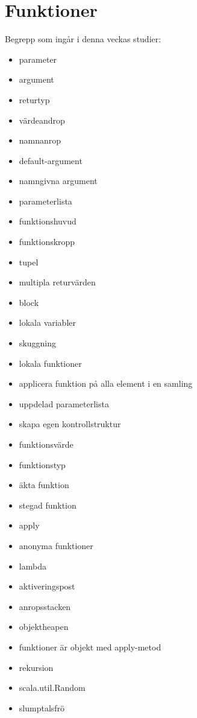 \chapter{Funktioner}\label{chapter:W03}
Begrepp som ingår i denna veckas studier:
\begin{multicols}{2}\begin{itemize}[noitemsep,label={$\square$},leftmargin=*]
\item parameter
\item argument
\item returtyp
\item värdeandrop
\item namnanrop
\item default-argument
\item namngivna argument
\item parameterlista
\item funktionshuvud
\item funktionskropp
\item tupel
\item multipla returvärden
\item block
\item lokala variabler
\item skuggning
\item lokala funktioner
\item applicera funktion på alla element i en samling
\item uppdelad parameterlista
\item skapa egen kontrollstruktur
\item funktionsvärde
\item funktionstyp
\item äkta funktion
\item stegad funktion
\item apply
\item anonyma funktioner
\item lambda
\item aktiveringspost
\item anropsstacken
\item objektheapen
\item funktioner är objekt med apply-metod
\item rekursion
\item scala.util.Random
\item slumptalsfrö\end{itemize}\end{multicols}
